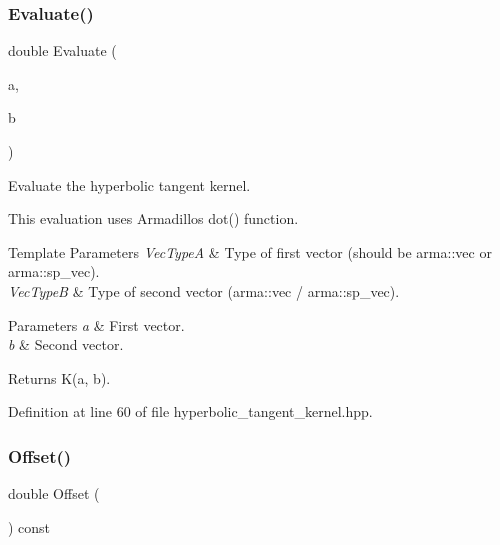 \subsubsection{Evaluate()}
{\footnotesize\ttfamily double Evaluate (\begin{DoxyParamCaption}\item[{const Vec\+TypeA \&}]{a,  }\item[{const Vec\+TypeB \&}]{b }\end{DoxyParamCaption})\hspace{0.3cm}{\ttfamily [inline]}}



Evaluate the hyperbolic tangent kernel. 

This evaluation uses Armadillo\textquotesingle{}s dot() function.


\begin{DoxyTemplParams}{Template Parameters}
{\em Vec\+TypeA} & Type of first vector (should be arma\+::vec or arma\+::sp\+\_\+vec). \\
\hline
{\em Vec\+TypeB} & Type of second vector (arma\+::vec / arma\+::sp\+\_\+vec). \\
\hline
\end{DoxyTemplParams}

\begin{DoxyParams}{Parameters}
{\em a} & First vector. \\
\hline
{\em b} & Second vector. \\
\hline
\end{DoxyParams}
\begin{DoxyReturn}{Returns}
K(a, b). 
\end{DoxyReturn}


Definition at line 60 of file hyperbolic\+\_\+tangent\+\_\+kernel.\+hpp.

\mbox{\label{classmlpack_1_1kernel_1_1HyperbolicTangentKernel_a9ed024e37386d2b9c8976b221c237ab8}} 
\subsubsection{Offset()\hspace{0.1cm}{\footnotesize\ttfamily [1/2]}}
{\footnotesize\ttfamily double Offset (\begin{DoxyParamCaption}{ }\end{DoxyParamCaption}) const\hspace{0.3cm}{\ttfamily [inline]}}



